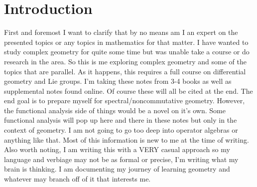 \thispagestyle{empty}
\section*{Introduction}
First and foremost I want to clarify that by no means am I an expert on the presented
topics or any topics in mathematics for that matter. I have wanted to study complex
geometry for quite some time but was unable take a course or do research in the area.
So this is me exploring complex geometry and some of the topics that are parallel.
As it happens, this requires a full course on differential geometry and Lie groups.
I'm taking these notes from 3-4 books as well as supplemental notes found online.
Of course these will all be cited at the end. The end goal is to prepare myself for
spectral/noncommutative geometry. However, the functional analysis side of things
would be a novel on it's own. Some functional analysis will pop up here and there
in these notes but only in the context of geometry. I am not going to go too deep
into operator algebras or anything like that. Most of this information is new to
me at the time of writing. Also worth noting, I am writing this with a VERY casual
approach so my language and verbiage may not be as formal or precise, I'm writing
what my brain is thinking. I am documenting my journey of learning geometry and
whatever may branch off of it that interests me.
